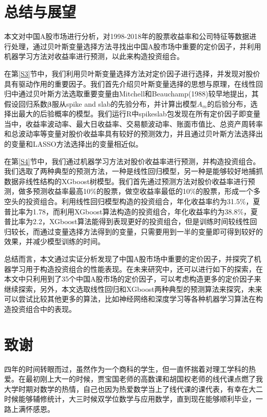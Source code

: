 \documentclass[12pt]{article} %
\begin{document}
	\newpage
	\section{总结与展望}
	本文对中国A股市场进行分析，对1998-2018年的股票收益率和公司特征等数据进行处理，通过贝叶斯变量选择方法寻找出中国A股市场中重要的定价因子，并利用机器学习方法对收益率进行预测，以此来构造投资组合。
	
	在第\ref{S3}节中，我们利用贝叶斯变量选择方法对定价因子进行选择，并发现对股价具有驱动作用的重要因子。我们首先介绍贝叶斯变量选择的思想与原理，在线性回归中通过贝叶斯方法选取重要变量由Mitchell和Beauchamp(1988)较早地提出，其假设回归系数$\boldsymbol{\beta}$服从spike and slab的先验分布，并计算出模型$A_m$的后验分布，选择出最大的后验概率的模型。我们运行R中spikeslab包发现在所有定价因子即变量当中，收益率波动率、最大日收益率、交易额波动率、账面市值比、总资产周转率和总波动率等变量对股价收益率具有较好的预测效力，并且通过贝叶斯方法选择出的变量和LASSO方法选择出的变量相近似。
	
	在第\ref{S4}节中，我们通过机器学习方法对股价收益率进行预测，并构造投资组合。我们选取了两种典型的预测方法，一种是线性回归模型，另一种是能够较好地捕抓数据非线性结构的XGboost树模型。我们首先通过预测方法对股价收益率进行预测，做多预测收益率最高10\%的股票，做空收益率最低的10\%的股票，形成一个多空头的投资组合。利用线性回归模型构造的投资组合，年化收益率约为31.5\%，夏普比率为1.78，而利用XGboost算法构造的投资组合，年化收益率约为38.8\%，夏普比率为2.2，XGboost算法能得到表现更好的投资组合，但是训练时间较线性回归较长，而通过变量选择方法得到的变量，只需要用到一半的变量即可得到较好的效果，并减少模型训练的时间。
	
	总结而言，本文通过实证分析发现了中国A股市场中重要的定价因子，并探究了机器学习用于构造投资组合的性能表现。在未来研究中，还可以进行如下的探索，在本文中只利用到了35个中国A股市场的定价因子，可以考虑构造更多的定价因子来继续探索，另外，本文选取线性回归和XGboost两种典型的预测算法来探究，未来可以尝试比较其他更多的算法，比如神经网络和深度学习等各种机器学习算法在构造投资组合中的表现。
	
	\newpage
	\section{致谢}
	四年的时间转眼而过，虽然作为一个商科的学生，但一直怀揣着对理工学科的热爱。在最初刚上大一的时候，贾宝国老师的高数课和胡国权老师的线代课点燃了我大学时期对数学的热情，自己也因为热爱数学当上了线代课的课代表，有幸在大二时候能够辅修统计，大三时候双学位数学与应用数学，直到现在能够顺利毕业，一路上满怀感恩。
	
\end{document}
